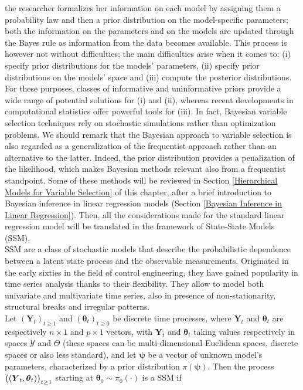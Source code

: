 \documentclass[
  12pt,
]{book}
\theoremstyle{break}
\theoremstyle{nonumberplain}
\begin{document}
the researcher formalizes her information on each model by assigning
them a probability law and then a prior distribution on the
model-specific parameters; both the information on the parameters and on
the models are updated through the Bayes rule as information from the
data becomes available. This process is however not without
difficulties; the main difficulties arise when it comes to: (i) specify
prior distributions for the models' parameters, (ii) specify prior
distributions on the models' space and (iii) compute the posterior
distributions. For these purposes, classes of informative and
uninformative priors provide a wide range of potential solutions for (i)
and (ii), whereas recent developments in computational statistics offer
powerful tools for (iii). In fact, Bayesian variable selection
techniques rely on stochastic simulations rather than optimization
problems. We should remark that the Bayesian approach to variable
selection is also regarded as a generalization of the frequentist
approach rather than an alternative to the latter. Indeed, the prior
distribution provides a penalization of the likelihood, which makes
Bayesian methods relevant also from a frequentist standpoint. Some of
these methods will be reviewed in Section
\ref{Hierarchical Models for Variable Selection} of this chapter, after
a brief introduction to Bayesian inference in linear regression models
(Section \ref{Bayesian Inference in Linear Regression}). Then, all the
considerations made for the standard linear regression model will be
translated in the framework of State-State Models (SSM).\\
SSM are a class of stochastic models that describe the probabilistic
dependence between a latent state process and the observable
measurements. Originated in the early sixties in the field of control
engineering, they have gained popularity in time series analysis thanks
to their flexibility. They allow to model both univariate and
multivariate time series, also in presence of non-stationarity,
structural breaks and irregular patterns.\\
Let \((\boldsymbol{Y}_{t})_{t \geq 1}\) and
\((\boldsymbol{\theta}_{t})_{t \geq 0}\) be discrete time processes,
where \(\boldsymbol{Y}_{t}\) and \(\boldsymbol{\theta}_{t}\) are
respectively \(n\times 1\) and \(p \times 1\) vectors, with
\(\boldsymbol{Y}_t\) and \(\boldsymbol{\theta}_t\) taking values
respectively in spaces \(\mathcal{Y}\) and \(\Theta\) (these spaces can
be multi-dimensional Euclidean spaces, discrete spaces or also less
standard), and let \(\boldsymbol{\psi}\) be a vector of unknown model's
parameters, characterized by a prior distribution
\(\pi(\boldsymbol{\psi})\). Then the process
\(\big{(}(\boldsymbol{Y}_{t},\boldsymbol{\theta}_{t})\big)_{t\geq 1}\)
starting at \(\boldsymbol{\theta}_{0} \sim \pi_{0}(\cdot)\) is a SSM if
\end{document}
